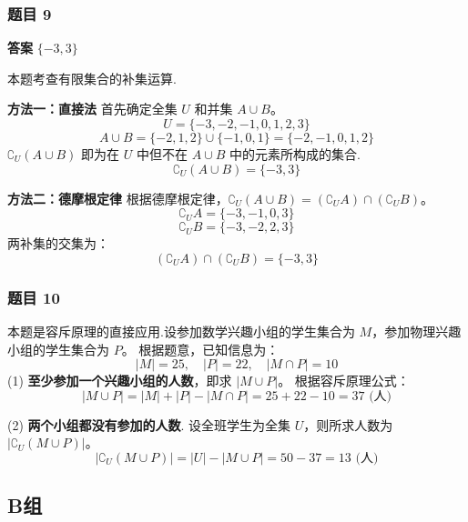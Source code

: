 \subsubsection*{题目 9}
\begin{solution}
	\textbf{答案} $\{-3, 3\}$
	
	本题考查有限集合的补集运算.
	
	\textbf{方法一：直接法}
	首先确定全集 $U$ 和并集 $A \cup B$。
	\[ U = \{-3, -2, -1, 0, 1, 2, 3\} \]
	\[ A \cup B = \{-2, 1, 2\} \cup \{-1, 0, 1\} = \{-2, -1, 0, 1, 2\} \]
	$\complement_U(A \cup B)$ 即为在 $U$ 中但不在 $A \cup B$ 中的元素所构成的集合.
	\[ \complement_U(A \cup B) = \{-3, 3\} \]
	
	\textbf{方法二：德摩根定律}
	根据德摩根定律，$\complement_U(A \cup B) = (\complement_U A) \cap (\complement_U B)$。
	\[ \complement_U A = \{-3, -1, 0, 3\} \]
	\[ \complement_U B = \{-3, -2, 2, 3\} \]
	两补集的交集为：
	\[ (\complement_U A) \cap (\complement_U B) = \{-3, 3\} \]
\end{solution}

\subsubsection*{题目 10}
\begin{solution}
	本题是容斥原理的直接应用.设参加数学兴趣小组的学生集合为 $M$，参加物理兴趣小组的学生集合为 $P$。
	根据题意，已知信息为：
	\[ |M| = 25, \quad |P| = 22, \quad |M \cap P| = 10 \]
	(1) \textbf{至少参加一个兴趣小组的人数}，即求 $|M \cup P|$。
	根据容斥原理公式：
	\[ |M \cup P| = |M| + |P| - |M \cap P| = 25 + 22 - 10 = 37 \text{ (人)} \]
	
	(2) \textbf{两个小组都没有参加的人数}.
	设全班学生为全集 $U$，则所求人数为 $|\complement_U(M \cup P)|$。
	\[ |\complement_U(M \cup P)| = |U| - |M \cup P| = 50 - 37 = 13 \text{ (人)} \]
\end{solution}

\subsection*{B组}

